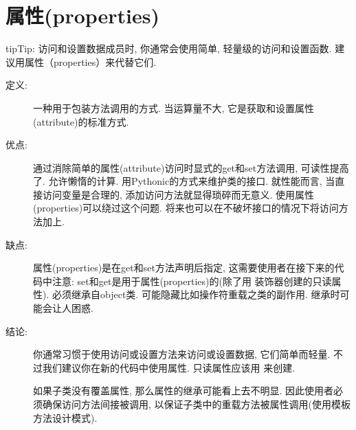 \documentclass[a4paper,10pt,english]{sphinxmanual}
\begin{document}
\section{属性(properties)}
\label{\detokenize{python_language_rules:properties}}
\begin{sphinxadmonition}{tip}{Tip:}
访问和设置数据成员时, 你通常会使用简单, 轻量级的访问和设置函数. 建议用属性（properties）来代替它们.
\end{sphinxadmonition}
\begin{description}
\item[{定义:}] \leavevmode
一种用于包装方法调用的方式. 当运算量不大, 它是获取和设置属性(attribute)的标准方式.

\item[{优点:}] \leavevmode
通过消除简单的属性(attribute)访问时显式的get和set方法调用, 可读性提高了. 允许懒惰的计算. 用Pythonic的方式来维护类的接口. 就性能而言, 当直接访问变量是合理的, 添加访问方法就显得琐碎而无意义. 使用属性(properties)可以绕过这个问题. 将来也可以在不破坏接口的情况下将访问方法加上.

\item[{缺点:}] \leavevmode
属性(properties)是在get和set方法声明后指定, 这需要使用者在接下来的代码中注意: set和get是用于属性(properties)的(除了用  装饰器创建的只读属性).  必须继承自object类. 可能隐藏比如操作符重载之类的副作用. 继承时可能会让人困惑.

\item[{结论:}] \leavevmode
你通常习惯于使用访问或设置方法来访问或设置数据, 它们简单而轻量. 不过我们建议你在新的代码中使用属性. 只读属性应该用   来创建.

如果子类没有覆盖属性, 那么属性的继承可能看上去不明显. 因此使用者必须确保访问方法间接被调用, 以保证子类中的重载方法被属性调用(使用模板方法设计模式).

%
\begin{sphinxVerbatim}[commandchars=\\\{\}]
  

      



\end{sphinxVerbatim}
\end{description}
\end{document}

